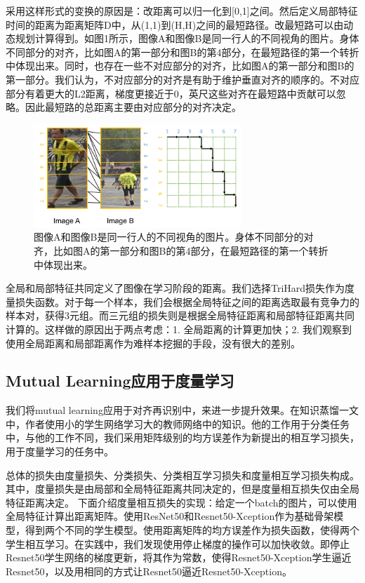 采用这样形式的变换的原因是：改距离可以归一化到[0,1]之间。然后定义局部特征时间的距离为距离矩阵D中，从(1,1)到(H,H)之间的最短路径。改最短路可以由动态规划计算得到。如图1所示，图像A和图像B是同一行人的不同视角的图片。身体不同部分的对齐，比如图A的第一部分和图B的第4部分，在最短路径的第一个转折中体现出来。同时，也存在一些不对应部分的对齐，比如图A的第一部分和图B的第一部分。我们认为，不对应部分的对齐是有助于维护垂直对齐的顺序的。不对应部分有着更大的L2距离，梯度更接近于0，英尺这些对齐在最短路中贡献可以忽略。因此最短路的总距离主要由对应部分的对齐决定。

\begin{figure}
	\centering
	\captionsetup{width=.88\linewidth}
	\includegraphics[width=.6\linewidth,keepaspectratio]{data/waiwenfanyi/placeholder.png}
	\caption{\kaiti 图像A和图像B是同一行人的不同视角的图片。身体不同部分的对齐，比如图A的第一部分和图B的第4部分，在最短路径的第一个转折中体现出来。}
	\label{figure:placeholder}
\end{figure}

全局和局部特征共同定义了图像在学习阶段的距离。我们选择TriHard损失作为度量损失函数。对于每一个样本，我们会根据全局特征之间的距离选取最有竞争力的样本对，获得3元组。而三元组的损失则是根据全局特征距离和局部特征距离共同计算的。这样做的原因出于两点考虑：1. 全局距离的计算更加快；2. 我们观察到使用全局距离和局部距离作为难样本挖掘的手段，没有很大的差别。

\subsection{Mutual Learning应用于度量学习}

我们将mutual learning应用于对齐再识别中，来进一步提升效果。在知识蒸馏一文中，作者使用小的学生网络学习大的教师网络中的知识。他的工作用于分类任务中，与他的工作不同，我们采用矩阵级别的均方误差作为新提出的相互学习损失，用于度量学习的任务中。

总体的损失由度量损失、分类损失、分类相互学习损失和度量相互学习损失构成。其中，度量损失是由局部和全局特征距离共同决定的，但是度量相互损失仅由全局特征距离决定。
下面介绍度量相互损失的实现：给定一个batch的图片，可以使用全局特征计算出距离矩阵。使用ResNet50和Resnet50-Xception作为基础骨架模型，得到两个不同的学生模型。使用距离矩阵的均方误差作为损失函数，使得两个学生相互学习。在实践中，我们发现使用停止梯度的操作可以加快收敛。即停止Resnet50学生网络的梯度更新，将其作为常数，使得Resnet50-Xception学生逼近Resnet50，以及用相同的方式让Resnet50逼近Resnet50-Xception。

